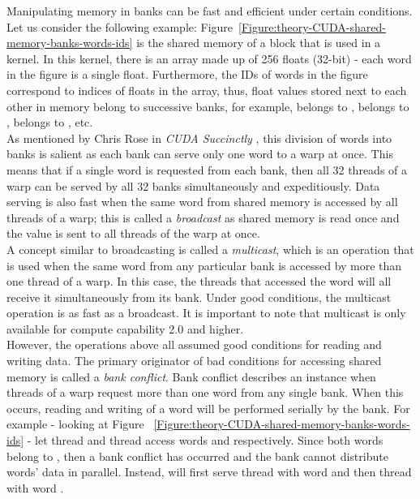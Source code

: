 Manipulating memory in banks can be fast and efficient under certain conditions. Let us consider the following example: Figure~\ref{Figure:theory-CUDA-shared-memory-banks-words-ids} is the shared memory of a block that is used in a kernel. In this kernel, there is an array made up of 256 floats (32-bit) - each word in the figure is a single float. Furthermore, the IDs of words in the figure correspond to indices of floats in the array, thus, float values stored next to each other in memory belong to successive banks, for example,  belongs to ,  belongs to ,  belongs to , etc. \\
As mentioned by Chris Rose in \emph{CUDA Succinctly} \cite{Rose2017}, this division of words into banks is salient as each bank can serve only one word to a warp at once. This means that if a single word is requested from each bank, then all 32 threads of a warp can be served by all 32 banks simultaneously and expeditiously. Data serving is also fast when the same word from shared memory is accessed by all threads of a warp; this is called a \textit{broadcast} as shared memory is read once and the value is sent to all threads of the warp at once. \\
A concept similar to broadcasting is called a \textit{multicast}, which is an operation that is used when the same word from any particular bank is accessed by more than one thread of a warp. In this case, the threads that accessed the word will all receive it simultaneously from its bank. Under good conditions, the multicast operation is as fast as a broadcast. It is important to note that multicast is only available for compute capability 2.0 and higher. \\
However, the operations above all assumed good conditions for reading and writing data. The primary originator of bad conditions for accessing shared memory is called a \textit{bank conflict}. Bank conflict describes an instance when threads of a warp request more than one word from any single bank. When this occurs, reading and writing of a word will be performed serially by the bank. For example - looking at Figure ~\ref{Figure:theory-CUDA-shared-memory-banks-words-ids} - let thread  and thread  access words  and  respectively. Since both words belong to , then a bank conflict has occurred and the bank cannot distribute words' data in parallel. Instead,  will first serve thread  with word  and then thread  with word . \\
